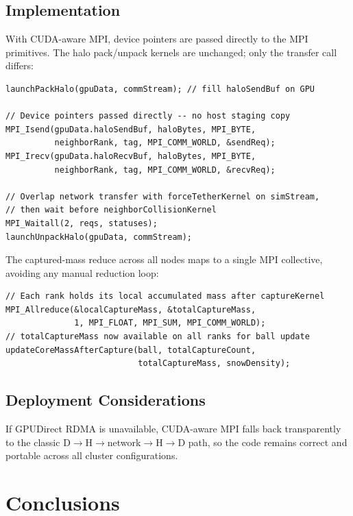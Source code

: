 \documentclass[conference]{IEEEtran}
\begin{document}
\subsection{Implementation}

With CUDA-aware MPI, device pointers are passed directly to the MPI
primitives. The halo pack/unpack kernels are unchanged; only the transfer
call differs:

\begin{lstlisting}[caption={Halo exchange with CUDA-aware MPI (non-blocking)}]
launchPackHalo(gpuData, commStream); // fill haloSendBuf on GPU

// Device pointers passed directly -- no host staging copy
MPI_Isend(gpuData.haloSendBuf, haloBytes, MPI_BYTE,
          neighborRank, tag, MPI_COMM_WORLD, &sendReq);
MPI_Irecv(gpuData.haloRecvBuf, haloBytes, MPI_BYTE,
          neighborRank, tag, MPI_COMM_WORLD, &recvReq);

// Overlap network transfer with forceTetherKernel on simStream,
// then wait before neighborCollisionKernel
MPI_Waitall(2, reqs, statuses);
launchUnpackHalo(gpuData, commStream);
\end{lstlisting}

The captured-mass reduce across all nodes maps to a single MPI collective,
avoiding any manual reduction loop:

\begin{lstlisting}[caption={Captured-mass reduce with MPI}]
// Each rank holds its local accumulated mass after captureKernel
MPI_Allreduce(&localCaptureMass, &totalCaptureMass,
              1, MPI_FLOAT, MPI_SUM, MPI_COMM_WORLD);
// totalCaptureMass now available on all ranks for ball update
updateCoreMassAfterCapture(ball, totalCaptureCount,
                           totalCaptureMass, snowDensity);
\end{lstlisting}

\subsection{Deployment Considerations}

If GPUDirect RDMA is unavailable, CUDA-aware MPI falls back transparently to
the classic D$\to$H$\to$network$\to$H$\to$D path, so the code remains
correct and portable across all cluster configurations.

\section{Conclusions}
\label{sec:conclusions}
\end{document}
